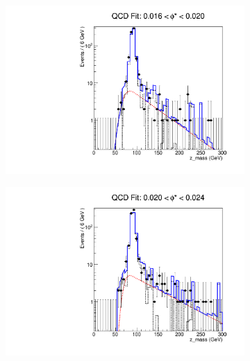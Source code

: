 \begin{figure}[!htbp]
    \centering
    \begin{subfigure}[b]{0.5\textwidth}
        \includegraphics[width=\linewidth]{figures/qcd_fits/qcd_fit_plot_for_05.pdf}
        \caption{}
        \label{fig:qcd_fit_05}
    \end{subfigure}%
    \begin{subfigure}[b]{0.5\textwidth}
        \includegraphics[width=\linewidth]{figures/qcd_fits/qcd_fit_plot_for_06.pdf}
        \caption{}
        \label{fig:qcd_fit_06}
    \end{subfigure}
    \begin{subfigure}[b]{0.5\textwidth}

\end{subfigure}
\end{figure}
